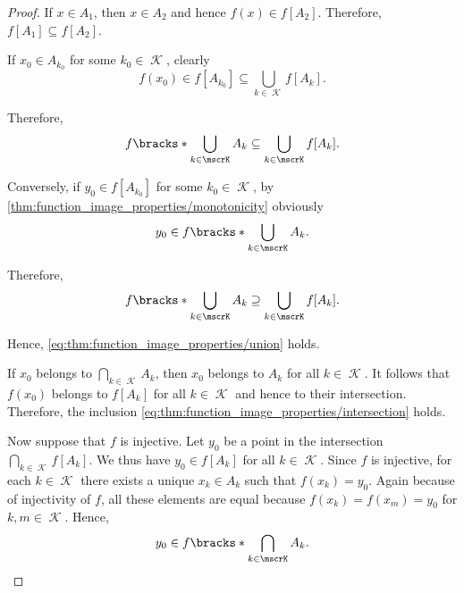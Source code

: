 \begin{proof}
   If \( x \in A_1 \), then \( x \in A_2 \) and hence \( f(x) \in f[A_2] \). Therefore, \( f[A_1] \subseteq f[A_2] \).

   If \( x_0 \in A_{k_0} \) for some \( k_0 \in \mscrK \), clearly
  \begin{equation*}
    f(x_0) \in f[A_{k_0}] \subseteq \bigcup_{k \in \mscrK} f[A_k].
  \end{equation*}

  Therefore,
  \begin{equation*}
    f\bracks*{ \bigcup_{k \in \mscrK} A_k } \subseteq \bigcup_{k \in \mscrK} f[A_k].
  \end{equation*}

  Conversely, if \( y_0 \in f[A_{k_0}] \) for some \( k_0 \in \mscrK \), by \cref{thm:function_image_properties/monotonicity} obviously
  \begin{equation*}
    y_0 \in f\bracks*{ \bigcup_{k \in \mscrK} A_k }.
  \end{equation*}

  Therefore,
  \begin{equation*}
    f\bracks*{ \bigcup_{k \in \mscrK} A_k } \supseteq \bigcup_{k \in \mscrK} f[A_k].
  \end{equation*}

  Hence, \eqref{eq:thm:function_image_properties/union} holds.

   If \( x_0 \) belongs to \( \bigcap_{k \in \mscrK} A_k \), then \( x_0 \) belongs to \( A_k \) for all \( k \in \mscrK \). It follows that \( f(x_0) \) belongs to \( f[A_k] \) for all \( k \in \mscrK \) and hence to their intersection. Therefore, the inclusion \eqref{eq:thm:function_image_properties/intersection} holds.

  Now suppose that \( f \) is injective. Let \( y_0 \) be a point in the intersection \( \bigcap_{k \in \mscrK} f[A_k] \). We thus have \( y_0 \in f[A_k] \) for all \( k \in \mscrK \). Since \( f \) is injective, for each \( k \in \mscrK \) there exists a unique \( x_k \in A_k \) such that \( f(x_k) = y_0 \). Again because of injectivity of \( f \), all these elements are equal because \( f(x_k) = f(x_m) = y_0 \) for \( k, m \in \mscrK \). Hence,
  \begin{equation*}
    y_0 \in f\bracks*{ \bigcap_{k \in \mscrK} A_k }.
  \end{equation*}


\end{proof}
